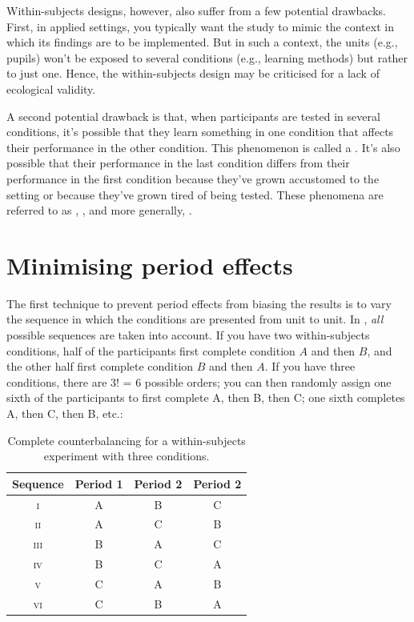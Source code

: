 Within-subjects designs, however, also suffer from a few potential drawbacks.
First, in applied settings, you typically want the study 
to mimic the context in which its findings are to be implemented.
But in such a context, the units (e.g., pupils) won't be exposed to several 
conditions (e.g., learning methods) but rather to just one.
Hence, the within-subjects design may be criticised for a lack of ecological validity.

A second potential drawback is that,
when participants are tested in several conditions,
it's possible that they learn something in one condition
that affects their performance in the other condition.
This phenomenon is called a .
It's also possible that their performance in the last condition differs
from their performance in the first condition because they've grown
accustomed to the setting or because they've grown tired of being tested.
These phenomena are referred to as
, ,
and more generally, .

\section{Minimising period effects}
The first technique to prevent period effects 
from biasing the results is to vary 
the sequence in which the conditions are presented from unit to unit.
In , \emph{all} possible sequences are 
taken into account. If you have two within-subjects conditions,
half of the participants first complete condition $A$ and then $B$,
and the other half first complete condition $B$ and then $A$.
If you have three conditions, there are 3! = 6 possible orders;
you can then randomly assign one sixth of the participants to 
first complete A, then B, then C;
one sixth completes A, then C, then B, etc.:
 
\begin{table}[h]
\centering
\caption{Complete counterbalancing for a within-subjects experiment with three conditions.}
\label{tab:counter}
\begin{tabular}{cccc}
\toprule
Sequence & Period 1 & Period 2 & Period 2 \\
\midrule
\textsc{i}  & A & B & C \\
\textsc{ii} & A & C & B \\
\textsc{iii}&  B & A & C \\
\textsc{iv} & B & C & A \\
\textsc{v}  & C & A & B \\
\textsc{vi} & C & B & A \\
\bottomrule
\end{tabular}
\end{table}

